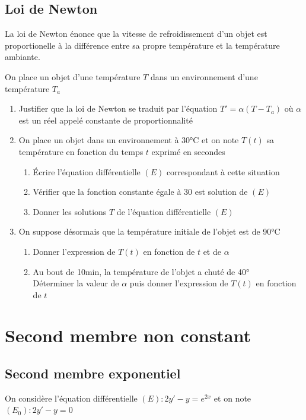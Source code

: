 \documentclass[oneside,12pt]{book}          %
\begin{document}
\subsection{Loi de Newton}
La loi de Newton énonce que la vitesse de refroidissement d'un objet est proportionelle à la différence entre sa propre température et la température ambiante.

On place un objet d'une température $T$ dans un environnement d'une température $T_a$

\begin{enumerate}
    \item Justifier que la loi de Newton se traduit par l'équation $T'=\alpha(T-T_a)$ où $\alpha$ est un réel appelé constante de proportionnalité
    \item On place un objet dans un environnement à 30°C et on note $T(t)$ sa température en fonction du temps $t$ exprimé en secondes
    \begin{enumerate}
        
    \item Écrire l'équation différentielle $(E)$ correspondant à cette situation
    \item Vérifier que la fonction constante égale à 30 est solution de $(E)$
    \item Donner les solutions $T$ de l'équation différentielle $(E)$
    \end{enumerate}
    \item On suppose désormais que la température initiale de l'objet est de 90°C
    \begin{enumerate}
        \item Donner l'expression de $T(t)$ en fonction de $t$ et de $\alpha$
        \item Au bout de 10min, la température de l'objet a chuté de 40°\\
        Déterminer la valeur de $\alpha$ puis donner l'expression de $T(t)$ en fonction de $t$
    \end{enumerate}
\end{enumerate}



\section{Second membre non constant}

\subsection{Second membre exponentiel}
  On considère l'équation différentielle $(E):2y'-y=e^{2x}$ et on note $(E_0):2y'-y=0$
\end{document}
